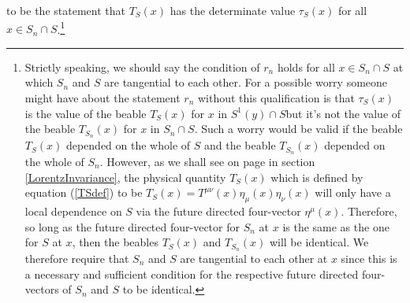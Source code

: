 \documentclass[12pt]{report}
\providecommand{\DIFadd}[1]{{\protect\color{blue}\uwave{#1}}} %
\providecommand{\DIFaddbegin}{} %
\providecommand{\DIFaddend}{} %
\begin{document}
%
to be the statement that  $T_S(x)$ has the determinate value $\tau_S(x)$ for all $x\in S_n\cap S$.\footnote{\label{tangentialnote}Strictly speaking, we should say the condition of $r_n$ holds for all $x\in S_n\cap S$ at which $S_n$ and $S$ are tangential to each other. For a possible worry someone might have about the statement $r_n$ without this qualification is that $\tau_S(x)$ is the value of the beable $T_S(x)$ for $x$ in $S^1(y)\cap S$\DIFaddbegin \DIFadd{, }\DIFaddend but it's not the value of the beable $T_{S_n}(x)$ for $x$ in $S_n\cap S$. Such a worry would be valid if the beable $T_S(x)$ depended on the whole of $S$ and the beable $T_{S_n}(x)$ depended on the whole of $S_n$. However, as we shall see on page \pageref{localdependenceS} in section \ref{LorentzInvariance}, the physical quantity $T_S(x)$ which is defined by equation (\ref{TSdef}) to be $T_S(x)=T^{\mu\nu}(x)\eta_{\mu}(x)\eta_{\nu}(x)$ will only have a local dependence on $S$ via the future directed four-vector $\eta^\mu(x)$. Therefore, so long as the future directed four-vector for $S_n$ at $x$ is the same as the one for $S$ at $x$, then the beables $T_{S}(x)$ and  $T_{S_n}(x)$ will be identical. We therefore require that $S_n$ and $S$ are tangential to each other at $x$ since this is a necessary and sufficient condition for the respective future directed four-vectors of $S_n$ and $S$ to be identical.
\newline
\newline
}
\end{document}
